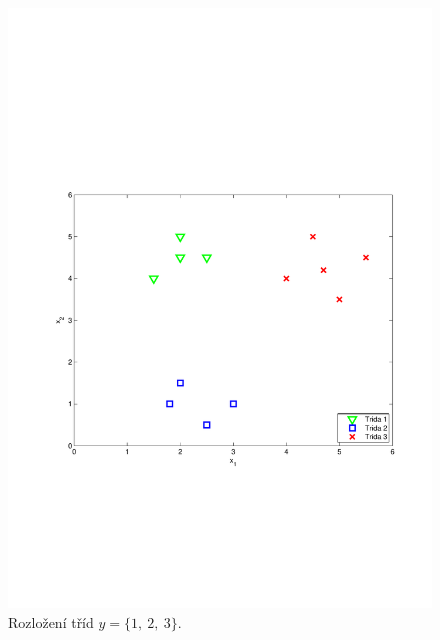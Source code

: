 \begin{figure}[!ht]
	\centering
	\begin{minipage}[b]{0.48\textwidth}
		\includegraphics[width = \textwidth, trim = 2.5cm 7cm 2cm 9cm]{./Img/BinarniRegrese/oneVSallClassification/oneVSall_all.pdf}
  		\caption{Rozložení tříd $y = \{1,~2,~3\}$.}
		\label{fig:oneVSall_all2}
	\end{minipage}%
	\hfill
	\begin{minipage}[b]{0.48\textwidth}

\end{minipage}
\end{figure}
